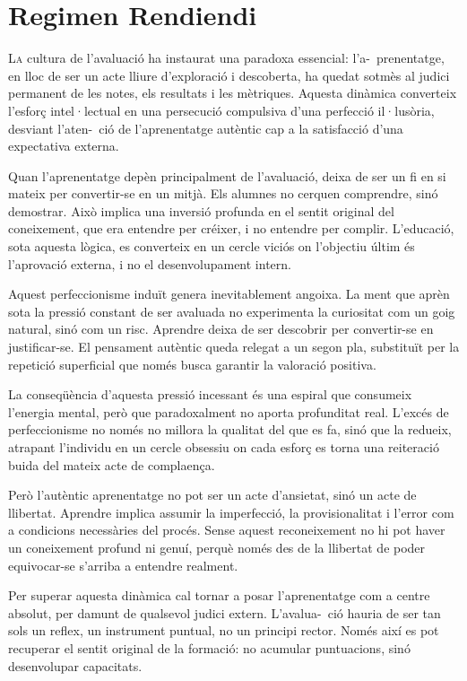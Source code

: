\chapter{Regimen Rendiendi}


\lettrine[loversize=0.2,lines=2]{L}{a} cultura de l'avaluació ha instaurat una paradoxa essencial: l'a-\ prenentatge, en lloc de ser un acte lliure d’exploració i descoberta, ha quedat sotmès al judici permanent de les notes, els resultats i les mètriques. Aquesta dinàmica converteix l’esforç intel·lectual en una persecució compulsiva d'una perfecció il·lusòria, desviant l’aten-\ ció de l'aprenentatge autèntic cap a la satisfacció d’una expectativa externa.

Quan l’aprenentatge depèn principalment de l’avaluació, deixa de ser un fi en si mateix per convertir-se en un mitjà. Els alumnes no cerquen comprendre, sinó demostrar. Això implica una inversió profunda en el sentit original del coneixement, que era entendre per créixer, i no entendre per complir. L’educació, sota aquesta lògica, es converteix en un cercle viciós on l’objectiu últim és l’aprovació externa, i no el desenvolupament intern.

Aquest perfeccionisme induït genera inevitablement angoixa. La ment que aprèn sota la pressió constant de ser avaluada no experimenta la curiositat com un goig natural, sinó com un risc. Aprendre deixa de ser descobrir per convertir-se en justificar-se. El pensament autèntic queda relegat a un segon pla, substituït per la repetició superficial que només busca garantir la valoració positiva.

La conseqüència d’aquesta pressió incessant és una espiral que consumeix l’energia mental, però que paradoxalment no aporta profunditat real. L’excés de perfeccionisme no només no millora la qualitat del que es fa, sinó que la redueix, atrapant l’individu en un cercle obsessiu on cada esforç es torna una reiteració buida del mateix acte de complaença.

Però l’autèntic aprenentatge no pot ser un acte d’ansietat, sinó un acte de llibertat. Aprendre implica assumir la imperfecció, la provisionalitat i l’error com a condicions necessàries del procés. Sense aquest reconeixement no hi pot haver un coneixement profund ni genuí, perquè només des de la llibertat de poder equivocar-se s’arriba a entendre realment.

Per superar aquesta dinàmica cal tornar a posar l’aprenentatge com a centre absolut, per damunt de qualsevol judici extern. L’avalua-\ ció hauria de ser tan sols un reflex, un instrument puntual, no un principi rector. Només així es pot recuperar el sentit original de la formació: no acumular puntuacions, sinó desenvolupar capacitats.

